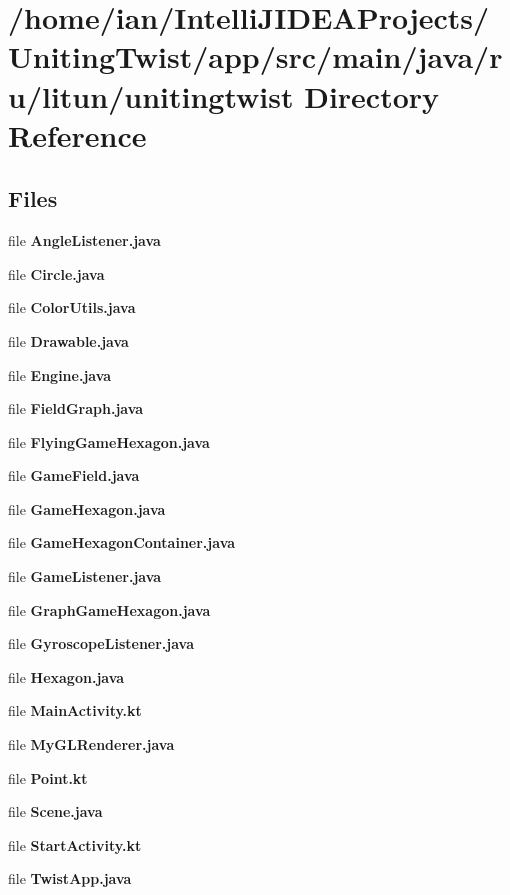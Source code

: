 \section{/home/ian/\+Intelli\+J\+I\+D\+E\+A\+Projects/\+Uniting\+Twist/app/src/main/java/ru/litun/unitingtwist Directory Reference}
\label{dir_48cefd673dc3681a1ecef6ba2ac84119}
\subsection*{Files}
\begin{DoxyCompactItemize}
\item 
file \textbf{ Angle\+Listener.\+java}
\item 
file \textbf{ Circle.\+java}
\item 
file \textbf{ Color\+Utils.\+java}
\item 
file \textbf{ Drawable.\+java}
\item 
file \textbf{ Engine.\+java}
\item 
file \textbf{ Field\+Graph.\+java}
\item 
file \textbf{ Flying\+Game\+Hexagon.\+java}
\item 
file \textbf{ Game\+Field.\+java}
\item 
file \textbf{ Game\+Hexagon.\+java}
\item 
file \textbf{ Game\+Hexagon\+Container.\+java}
\item 
file \textbf{ Game\+Listener.\+java}
\item 
file \textbf{ Graph\+Game\+Hexagon.\+java}
\item 
file \textbf{ Gyroscope\+Listener.\+java}
\item 
file \textbf{ Hexagon.\+java}
\item 
file \textbf{ Main\+Activity.\+kt}
\item 
file \textbf{ My\+G\+L\+Renderer.\+java}
\item 
file \textbf{ Point.\+kt}
\item 
file \textbf{ Scene.\+java}
\item 
file \textbf{ Start\+Activity.\+kt}
\item 
file \textbf{ Twist\+App.\+java}
\end{DoxyCompactItemize}

